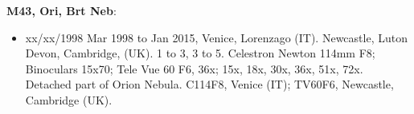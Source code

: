 {\bf M43, Ori, Brt Neb}:
\begin{itemize}
\item xx/xx/1998 Mar 1998 to Jan 2015, Venice, Lorenzago (IT). Newcastle, Luton Devon, Cambridge, (UK). 1 to 3, 3 to 5. Celestron Newton 114mm F8; Binoculars 15x70; Tele Vue 60 F6, 36x; 15x, 18x, 30x, 36x, 51x, 72x. Detached part of Orion Nebula. C114F8, Venice (IT); TV60F6, Newcastle, Cambridge (UK).
\end{itemize}
